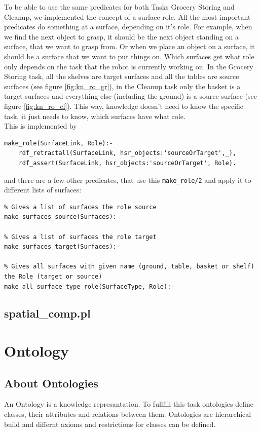 \documentclass[main.tex]{subfiles}
\begin{document}
To be able to use the same predicates for both Tasks Grocery Storing and Cleanup, we implemented the concept of a surface role. All the most important predicates do something at a surface, depending on it's role. For example, when we find the next object to grasp, it should be the next object standing on a surface, that we want to grasp from. Or when we place an object on a surface, it should be a surface that we want to put things on. Which surfaces get what role only depends on the task that the robot is currently working on. In the Grocery Storing task, all the shelves are target surfaces and all the tables are source surfaces (see figure \ref{fig:kn_ro_gr}), in the Cleanup task only the basket is a target surfaces and everything else (including the ground) is a source surface (see figure \ref{fig:kn_ro_cl}). This way, knowledge doesn't need to know the specific task, it just needs to know, which surfaces have what role.\\
This is implemented by 

\begin{lstlisting}
make_role(SurfaceLink, Role):-
    rdf_retractall(SurfaceLink, hsr_objects:'sourceOrTarget',_),
    rdf_assert(SurfaceLink, hsr_objects:'sourceOrTarget', Role).
\end{lstlisting}
and there are a few other predicates, that use this \texttt{make\_role/2} and apply it to different lists of surfaces:
\begin{lstlisting}
% Gives a list of surfaces the role source
make_surfaces_source(Surfaces):-

% Gives a list of surfaces the role target
make_surfaces_target(Surfaces):-

% Gives all surfaces with given name (ground, table, basket or shelf) the Role (target or source)
make_all_surface_type_role(SurfaceType, Role):-
\end{lstlisting}


\subsection{spatial\_comp.pl}



\section{Ontology}
\subsection{About Ontologies}
An Ontology is a knowledge represantation. To fullfill this task ontologies define classes, their attributes and relations between them. Ontologies are hierarchical build and differnt axioms and restrictions for classes can be defined.
\end{document}

